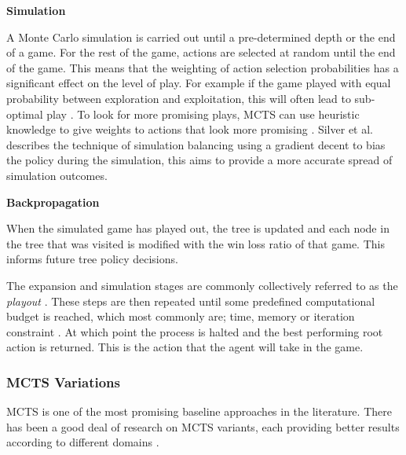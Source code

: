 \documentclass[journal]{IEEEtran}
\begin{document}
		\textbf{Simulation}
		
			A Monte Carlo simulation is carried out until a pre-determined depth or the end of a game.
			For the rest of the game, actions are selected at random until the end of the game. This means that the weighting of action selection probabilities has a significant effect on the level of play. For example if the game played with equal probability between exploration and exploitation, this will often lead to sub-optimal play \cite{chaslot2008monte}. 
			To look for more promising plays, MCTS can use heuristic knowledge to give weights to actions that look more promising \cite{perez2014solving}.
			Silver et al. \cite{silver2009monte} describes the technique of simulation balancing using a gradient decent to bias the policy during the simulation, this aims to provide a more accurate spread of simulation outcomes.

		\textbf{Backpropagation}
		
			When the simulated game has played out, the tree is updated and each node in the tree that was visited is modified with the win loss ratio of that game. This informs future tree policy decisions.
			
			The expansion and simulation stages are commonly collectively referred to as the \textit{playout} \cite{powley2014information}.
			These steps are then repeated until some predefined computational budget is reached, which most commonly are; time, memory or iteration constraint \cite{browne2012survey}. At which point the process is halted and the best performing root action is returned. This is the action that the agent will take in the game.


		


		\subsubsection{MCTS Variations} \label{sssec:MCTSvariations}
			MCTS is one of the most promising baseline approaches in the  literature.
			There has been a good deal of research on MCTS variants, each providing better results according to different domains \cite{browne2012survey, park2015mcts, perez2014knowledge, ilhan2017monte, de2016monte, frydenberg2015investigating}.
\end{document}

